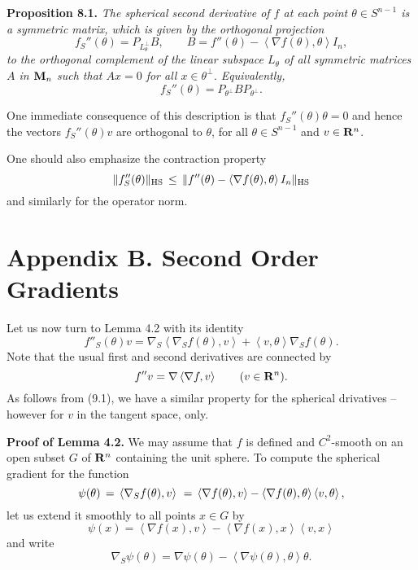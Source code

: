 \documentclass[reqno,12pt]{amsart}
\theoremstyle{plain}
\begin{document}
\vskip5mm
{\bf Proposition 8.1.} {\it The spherical second derivative of $f$ at each
point $\theta \in S^{n-1}$ is a symmetric matrix, which is given by the 
orthogonal projection
$$
f_S''(\theta) = P_{L_{\theta}^\perp} B, \qquad
B = f''(\theta) - \left<\nabla f(\theta),\theta\right> I_n,
$$
to the orthogonal complement of the linear subspace $L_{\theta}$ of 
all symmetric matrices $A$ in ${\bf M}_n$ such that $Ax = 0$ 
for all $x \in \theta^\perp$. Equivalently,
$$
f_S''(\theta) = P_{\theta^\perp} B P_{\theta^\perp}.
$$
}

One immediate consequence of this description is that 
$f_S''(\theta)\theta = 0$ and hence the vectors $f_S''(\theta)v$ are 
orthogonal to $\theta$, for all $\theta \in S^{n-1}$ and $v \in {{\bf R}}^n$.

One should also emphasize the contraction property
$$
\|f_S''(\theta)\|_{{\rm HS}} \, \leq \, 
\|f''(\theta) - \left<\nabla f(\theta),\theta\right> I_n\|_{{\rm HS}}
$$
and similarly for the operator norm.

\vskip10mm
\section{{\bf Appendix B. Second Order Gradients}}
\setcounter{equation}{0}

\vskip2mm
\noindent
Let us now turn to Lemma 4.2 with its identity
\begin{equation}
f''_S(\theta) v = \nabla_S \left<\nabla_S f(\theta),v\right> + 
\left<v,\theta\right> \nabla_S f(\theta).
\end{equation}
Note that the usual first and second derivatives are connected by
\begin{equation}
f'' v = \nabla \left<\nabla f,v\right> \qquad (v \in {{\bf R}}^n).
\end{equation}
As follows from (9.1), we have a similar property for the spherical 
drivatives -- however for $v$ in the tangent space, only.

\vskip5mm
{\bf Proof of Lemma 4.2.} We may assume that $f$ is defined and 
$C^2$-smooth on an open subset $G$ of ${{\bf R}}^n$ containing the unit sphere.
To compute the spherical gradient for the function
$$
\psi(\theta) \, = \, \left<\nabla_S f(\theta),v\right>  \\
 \, = \,
\left<\nabla f(\theta),v\right> - 
\left<\nabla f(\theta),\theta\right> \left<v,\theta\right>,
$$
let us extend it smoothly to all points $x \in G$ by
\begin{equation}
\psi(x) = 
\left<\nabla f(x),v\right> - \left<\nabla f(x),x\right> \left<v,x\right>
\end{equation}
and write
\begin{equation}
\nabla_S \psi(\theta) =
\nabla \psi(\theta) - \left<\nabla \psi(\theta),\theta\right> \theta.
\end{equation}
\end{document}
